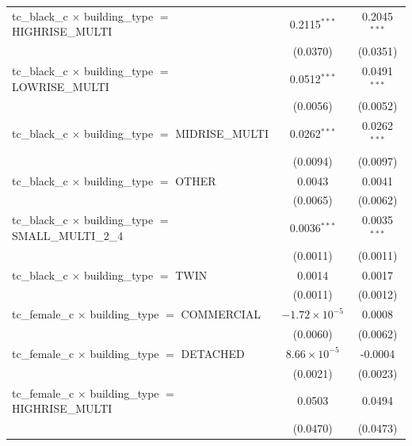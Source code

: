 \begin{tabular}{lcc}
   tc\_black\_c $\times$ building\_type $=$ HIGHRISE\_MULTI            & 0.2115$^{***}$         & 0.2045$^{***}$\\   
                                                                       & (0.0370)               & (0.0351)\\   
   tc\_black\_c $\times$ building\_type $=$ LOWRISE\_MULTI             & 0.0512$^{***}$         & 0.0491$^{***}$\\   
                                                                       & (0.0056)               & (0.0052)\\   
   tc\_black\_c $\times$ building\_type $=$ MIDRISE\_MULTI             & 0.0262$^{***}$         & 0.0262$^{***}$\\   
                                                                       & (0.0094)               & (0.0097)\\   
   tc\_black\_c $\times$ building\_type $=$ OTHER                      & 0.0043                 & 0.0041\\   
                                                                       & (0.0065)               & (0.0062)\\   
   tc\_black\_c $\times$ building\_type $=$ SMALL\_MULTI\_2\_4         & 0.0036$^{***}$         & 0.0035$^{***}$\\   
                                                                       & (0.0011)               & (0.0011)\\   
   tc\_black\_c $\times$ building\_type $=$ TWIN                       & 0.0014                 & 0.0017\\   
                                                                       & (0.0011)               & (0.0012)\\   
   tc\_female\_c $\times$ building\_type $=$ COMMERCIAL                & $-1.72\times 10^{-5}$  & 0.0008\\   
                                                                       & (0.0060)               & (0.0062)\\   
   tc\_female\_c $\times$ building\_type $=$ DETACHED                  & $8.66\times 10^{-5}$   & -0.0004\\   
                                                                       & (0.0021)               & (0.0023)\\   
   tc\_female\_c $\times$ building\_type $=$ HIGHRISE\_MULTI           & 0.0503                 & 0.0494\\   
                                                                       & (0.0470)               & (0.0473)\\   

\end{tabular}
